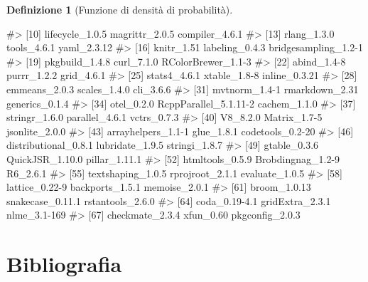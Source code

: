 \documentclass[
  italian,
  letterpaper,
  a4paper,
  11pt,
  open=any]{scrbook}
\newenvironment{Shaded}{\begin{snugshade}}{\end{snugshade}}
\newcommand{\CommentTok}[1]{\textcolor[rgb]{0.37,0.37,0.37}{#1}}
\theoremstyle{plain}
\theoremstyle{definition}
\theoremstyle{definition}
\newtheorem{definition}{Definizione}[chapter]
\theoremstyle{remark}
\begin{document}
\begin{definition}[Funzione di densità di
probabilità]
\begin{tcolorbox}
\begin{Shaded}
\begin{Highlighting}[]
\CommentTok{\#\textgreater{} [10] lifecycle\_1.0.5       magrittr\_2.0.5        compiler\_4.6.1       }
\CommentTok{\#\textgreater{} [13] rlang\_1.3.0           tools\_4.6.1           yaml\_2.3.12          }
\CommentTok{\#\textgreater{} [16] knitr\_1.51            labeling\_0.4.3        bridgesampling\_1.2{-}1 }
\CommentTok{\#\textgreater{} [19] pkgbuild\_1.4.8        curl\_7.1.0            RColorBrewer\_1.1{-}3   }
\CommentTok{\#\textgreater{} [22] abind\_1.4{-}8           purrr\_1.2.2           grid\_4.6.1           }
\CommentTok{\#\textgreater{} [25] stats4\_4.6.1          xtable\_1.8{-}8          inline\_0.3.21        }
\CommentTok{\#\textgreater{} [28] emmeans\_2.0.3         scales\_1.4.0          cli\_3.6.6            }
\CommentTok{\#\textgreater{} [31] mvtnorm\_1.4{-}1         rmarkdown\_2.31        generics\_0.1.4       }
\CommentTok{\#\textgreater{} [34] otel\_0.2.0            RcppParallel\_5.1.11{-}2 cachem\_1.1.0         }
\CommentTok{\#\textgreater{} [37] stringr\_1.6.0         parallel\_4.6.1        vctrs\_0.7.3          }
\CommentTok{\#\textgreater{} [40] V8\_8.2.0              Matrix\_1.7{-}5          jsonlite\_2.0.0       }
\CommentTok{\#\textgreater{} [43] arrayhelpers\_1.1{-}1    glue\_1.8.1            codetools\_0.2{-}20     }
\CommentTok{\#\textgreater{} [46] distributional\_0.8.1  lubridate\_1.9.5       stringi\_1.8.7        }
\CommentTok{\#\textgreater{} [49] gtable\_0.3.6          QuickJSR\_1.10.0       pillar\_1.11.1        }
\CommentTok{\#\textgreater{} [52] htmltools\_0.5.9       Brobdingnag\_1.2{-}9     R6\_2.6.1             }
\CommentTok{\#\textgreater{} [55] textshaping\_1.0.5     rprojroot\_2.1.1       evaluate\_1.0.5       }
\CommentTok{\#\textgreater{} [58] lattice\_0.22{-}9        backports\_1.5.1       memoise\_2.0.1        }
\CommentTok{\#\textgreater{} [61] broom\_1.0.13          snakecase\_0.11.1      rstantools\_2.6.0     }
\CommentTok{\#\textgreater{} [64] coda\_0.19{-}4.1         gridExtra\_2.3.1       nlme\_3.1{-}169         }
\CommentTok{\#\textgreater{} [67] checkmate\_2.3.4       xfun\_0.60             pkgconfig\_2.0.3}
\end{Highlighting}
\end{Shaded}

\end{tcolorbox}

\section*{Bibliografia}\label{bibliografia-3}



\end{definition}
\end{document}
